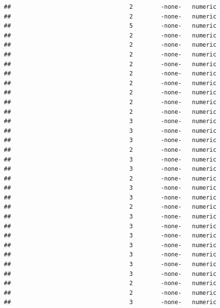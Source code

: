 \documentclass[
  12pt,
]{article}
\begin{document}
\begin{verbatim}
##                                  2        -none-   numeric                    
##                                  2        -none-   numeric                    
##                                  5        -none-   numeric                    
##                                  2        -none-   numeric                    
##                                  2        -none-   numeric                    
##                                  2        -none-   numeric                    
##                                  2        -none-   numeric                    
##                                  2        -none-   numeric                    
##                                  2        -none-   numeric                    
##                                  2        -none-   numeric                    
##                                  2        -none-   numeric                    
##                                  2        -none-   numeric                    
##                                  3        -none-   numeric                    
##                                  3        -none-   numeric                    
##                                  3        -none-   numeric                    
##                                  2        -none-   numeric                    
##                                  3        -none-   numeric                    
##                                  3        -none-   numeric                    
##                                  2        -none-   numeric                    
##                                  3        -none-   numeric                    
##                                  3        -none-   numeric                    
##                                  2        -none-   numeric                    
##                                  3        -none-   numeric                    
##                                  3        -none-   numeric                    
##                                  3        -none-   numeric                    
##                                  3        -none-   numeric                    
##                                  3        -none-   numeric                    
##                                  3        -none-   numeric                    
##                                  3        -none-   numeric                    
##                                  2        -none-   numeric                    
##                                  2        -none-   numeric                    
##                                  3        -none-   numeric                    

\end{verbatim}
\end{document}
